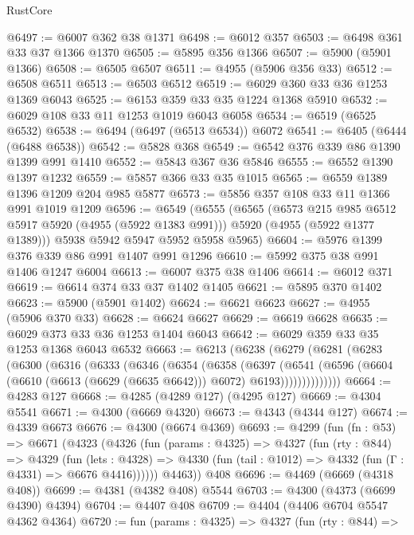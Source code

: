 \begin{lexlean}{RustCore}
\begin{coremodule}
@6497 := @6007 @362 @38 @1371
@6498 := @6012 @357
@6503 := @6498 @361 @33 @37 @1366 @1370
@6505 := @5895 @356 @1366
@6507 := @5900 (@5901 @1366)
@6508 := @6505 @6507
@6511 := @4955 (@5906 @356 @33)
@6512 := @6508 @6511
@6513 := @6503 @6512
@6519 := @6029 @360 @33 @36 @1253 @1369 @6043
@6525 := @6153 @359 @33 @35 @1224 @1368 @5910
@6532 := @6029 @108 @33 @11 @1253 @1019 @6043 @6058
@6534 := @6519 (@6525 @6532)
@6538 := @6494 (@6497 (@6513 @6534)) @6072
@6541 := @6405 (@6444 (@6488 @6538))
@6542 := @5828 @368
@6549 := @6542 @376 @339 @86 @1390 @1399 @991 @1410
@6552 := @5843 @367 @36 @5846
@6555 := @6552 @1390 @1397 @1232
@6559 := @5857 @366 @33 @35 @1015
@6565 := @6559 @1389 @1396 @1209 @204 @985 @5877
@6573 := @5856 @357 @108 @33 @11 @1366 @991 @1019 @1209
@6596 := @6549
    (@6555
      (@6565
        (@6573 @215 @985 @6512 @5917 @5920 (@4955 (@5922 @1383 @991)))
        @5920
        (@4955 (@5922 @1377 @1389)))
      @5938
      @5942
      @5947
      @5952
      @5958
      @5965)
@6604 := @5976 @1399 @376 @339 @86 @991 @1407 @991 @1296
@6610 := @5992 @375 @38 @991 @1406 @1247 @6004
@6613 := @6007 @375 @38 @1406
@6614 := @6012 @371
@6619 := @6614 @374 @33 @37 @1402 @1405
@6621 := @5895 @370 @1402
@6623 := @5900 (@5901 @1402)
@6624 := @6621 @6623
@6627 := @4955 (@5906 @370 @33)
@6628 := @6624 @6627
@6629 := @6619 @6628
@6635 := @6029 @373 @33 @36 @1253 @1404 @6043
@6642 := @6029 @359 @33 @35 @1253 @1368 @6043 @6532
@6663 := @6213
    (@6238
      (@6279
        (@6281
          (@6283
            (@6300
              (@6316
                (@6333
                  (@6346
                    (@6354
                      (@6358
                        (@6397
                          (@6541
                            (@6596
                              (@6604 (@6610 (@6613 (@6629 (@6635 @6642))) @6072) @6193))))))))))))))
@6664 := @4283 @127
@6668 := @4285 (@4289 @127) (@4295 @127)
@6669 := @4304 @5541
@6671 := @4300 (@6669 @4320)
@6673 := @4343 (@4344 @127)
@6674 := @4339 @6673
@6676 := @4300 (@6674 @4369)
@6693 := @4299
    (fun (fn : @53) =>
    @6671
      (@4323
        (@4326
          (fun (params : @4325) =>
          @4327
            (fun (rty : @844) =>
            @4329
              (fun (lets : @4328) =>
              @4330 (fun (tail : @1012) => @4332 (fun (Γ : @4331) => @6676 @4416))))))
        @4463))
    @408
@6696 := @4469 (@6669 (@4318 @408))
@6699 := @4381 (@4382 @408) @5544
@6703 := @4300 (@4373 (@6699 @4390) @4394)
@6704 := @4407 @408
@6709 := @4404 (@4406 @6704 @5547 @4362 @4364)
@6720 := fun (params : @4325) =>
  @4327
    (fun (rty : @844) =>

\end{coremodule}
\end{lexlean}
